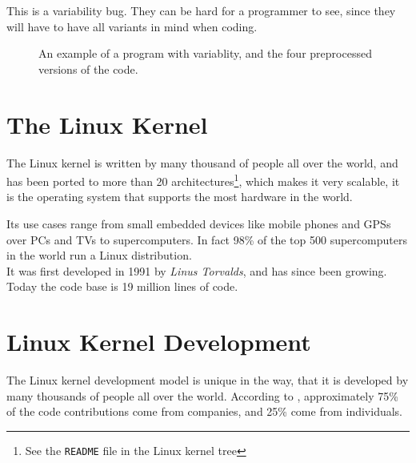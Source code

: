 \documentclass[a4paper,11pt]{report}
\newcommand{\f}{\footnote{\fn}}
\newcommand{\textcode}[1]{\fboxsep=1pt\texttt{\colorbox{gray!20}{#1}}}
\newcommand{\figa}{
    \begin{figure}[!htpb]
    \centering
}
\newcommand{\figb}[2]{
    \caption{#1}
    \label{#2}
    \end{figure}
}
\begin{document}
This is a variability bug. They can be hard for a programmer to see, since they will have to have all variants in mind when coding.

\figa
     \qquad
     \qquad
     \qquad
     \qquad
\figb{An example of a program with variablity, and the four preprocessed versions of the code.}{lst:varbug}

            
            \section{The Linux Kernel}

            \def \fn {See the \textcode{README} file in the Linux kernel tree}

The Linux kernel is written by many thousand of people all over 
the world, and has been ported to more than 20 architectures\f, which makes it 
very scalable, it is the operating system that supports the most hardware in
the world\cite{22thbirthday,gkh}.

Its use cases range from small embedded devices like mobile phones and GPSs over PCs and TVs to 
supercomputers. In fact 98\% of the top 500 supercomputers in the world run a 
Linux distribution\cite{top500}. 
\\

It was first developed in 1991 by \emph{Linus Torvalds}, and has since been 
growing. Today the code base is 19 million lines of code.


            \section{Linux Kernel Development}

            \def \fn {See the \textcode{MAINTAINERS} file in  
            the Linux kernel tree}

The Linux kernel development model is unique in the  way, that it is developed 
by many thousands of people all over the world. According to \cite{gkh}, 
approximately 75\% of the code contributions come from companies, and 25\% come from 
individuals. 
\end{document}
